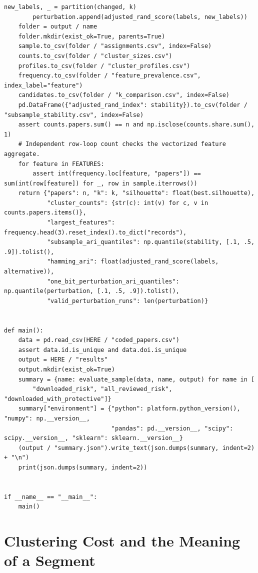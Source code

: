 \begin{Verbatim}[breaklines,breakanywhere,fontsize=\small]
        new_labels, _ = partition(changed, k)
        perturbation.append(adjusted_rand_score(labels, new_labels))
    folder = output / name
    folder.mkdir(exist_ok=True, parents=True)
    sample.to_csv(folder / "assignments.csv", index=False)
    counts.to_csv(folder / "cluster_sizes.csv")
    profiles.to_csv(folder / "cluster_profiles.csv")
    frequency.to_csv(folder / "feature_prevalence.csv", index_label="feature")
    candidates.to_csv(folder / "k_comparison.csv", index=False)
    pd.DataFrame({"adjusted_rand_index": stability}).to_csv(folder / "subsample_stability.csv", index=False)
    assert counts.papers.sum() == n and np.isclose(counts.share.sum(), 1)
    # Independent row-loop count checks the vectorized feature aggregate.
    for feature in FEATURES:
        assert int(frequency.loc[feature, "papers"]) == sum(int(row[feature]) for _, row in sample.iterrows())
    return {"papers": n, "k": k, "silhouette": float(best.silhouette),
            "cluster_counts": {str(c): int(v) for c, v in counts.papers.items()},
            "largest_features": frequency.head(3).reset_index().to_dict("records"),
            "subsample_ari_quantiles": np.quantile(stability, [.1, .5, .9]).tolist(),
            "hamming_ari": float(adjusted_rand_score(labels, alternative)),
            "one_bit_perturbation_ari_quantiles": np.quantile(perturbation, [.1, .5, .9]).tolist(),
            "valid_perturbation_runs": len(perturbation)}


def main():
    data = pd.read_csv(HERE / "coded_papers.csv")
    assert data.id.is_unique and data.doi.is_unique
    output = HERE / "results"
    output.mkdir(exist_ok=True)
    summary = {name: evaluate_sample(data, name, output) for name in [
        "downloaded_risk", "all_reviewed_risk", "downloaded_with_protective"]}
    summary["environment"] = {"python": platform.python_version(), "numpy": np.__version__,
                              "pandas": pd.__version__, "scipy": scipy.__version__, "sklearn": sklearn.__version__}
    (output / "summary.json").write_text(json.dumps(summary, indent=2) + "\n")
    print(json.dumps(summary, indent=2))


if __name__ == "__main__":
    main()
\end{Verbatim}

\hypertarget{M04-clustering-cost-and-the-meaning-of-a-segment}{%
\section{Clustering Cost and the Meaning of a
Segment}\label{M04-clustering-cost-and-the-meaning-of-a-segment}}

